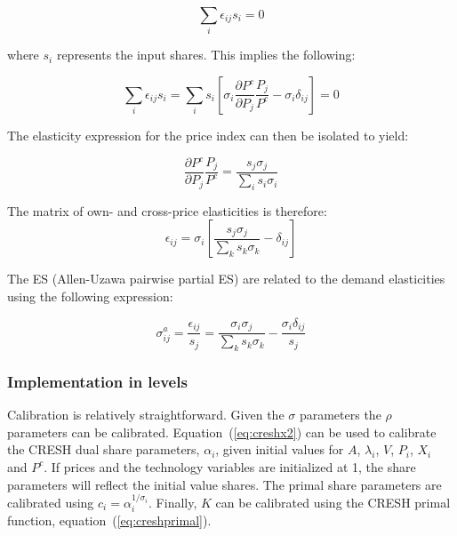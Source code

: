 \begin{displaymath}
\sum_i{\epsilon_{ij}s_i}=0
\end{displaymath}

\noindent where $s_i$ represents the input shares. This implies the following:

\begin{displaymath}
\sum_i{\epsilon_{ij}s_i}=\sum_i{s_i\left[\sigma_i \frac {\partial{P^c}}{\partial{P_j}}\frac{P_j}{P^c} - \sigma_i\delta_{ij}\right]}=0
\end{displaymath}

\noindent The elasticity expression for the price index can then be isolated to yield:

\begin{displaymath}
\frac {\partial{P^c}}{\partial{P_j}}\frac{P_j}{P^c} = \frac{s_j\sigma_j}{\sum_i{s_i\sigma_i}}
\end{displaymath}

\noindent The matrix of own- and cross-price elasticities is therefore:
\begin{equation}
\label{eq:creshelas2}
\epsilon_{ij} = \sigma_i\left[\frac{s_j\sigma_j}{\sum_k{s_k\sigma_k}} - \delta_{ij}\right]
\end{equation}

\noindent The ES (Allen-Uzawa pairwise partial ES) are related to the demand elasticities using the following
expression:

\begin{equation}
\label{eq:cresheselas}
\sigma^a_{ij} = \frac{\epsilon_{ij}}{s_j} = \frac{\sigma_i\sigma_j}{\sum_k{s_k\sigma_k}} - \frac{\sigma_i\delta_{ij}}{s_j}
\end{equation}

\subsubsection{Implementation in levels}

Calibration is relatively straightforward. Given the $\sigma$ parameters
the $\rho$ parameters can be calibrated.
Equation~(\ref{eq:creshx2}) can be used to calibrate the CRESH
dual share parameters, $\alpha_i$,
given initial values for $A$, $\lambda_i$, $V$, $P_i$, $X_i$ and $P^c$. If prices and the technology variables are initialized at 1, the share
parameters will reflect the initial value shares.
The primal share parameters are calibrated using $c_i=\alpha_i^{1/\sigma_i}$.
Finally, $K$ can be calibrated using the CRESH primal function,
equation~(\ref{eq:creshprimal}).

